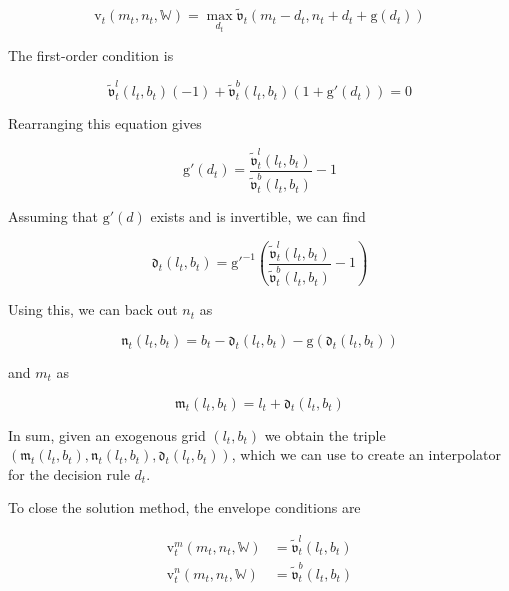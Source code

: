 \documentclass{article}
\newcommand{\bRat}{b}
\newcommand{\vFunc}{\mathrm{v}}
\newcommand{\mRat}{m}
\newcommand{\vOpt}{\tilde{\mathfrak{v}}}
\newcommand{\mEndFunc}{\mathfrak{m}}
\newcommand{\nRat}{n}
\newcommand{\dRat}{d}
\newcommand{\gFunc}{\mathrm{g}}
\newcommand{\lRat}{l}
\newcommand{\dEndFunc}{\mathfrak{d}}
\newcommand{\nEndFunc}{\mathfrak{n}}
\newcommand{\Work}{\mathbb{W}}
\begin{document}
\begin{equation}
\vFunc_{t}(\mRat_{t}, \nRat_{t}, \Work) = \max_{\dRat_{t}}
    \vOpt_{t}(\mRat_{t}
    - \dRat_{t}, \nRat_{t} + \dRat_{t} + \gFunc(\dRat_{t}))
\end{equation}

The first-order condition is

\begin{equation}
\vOpt_{t}^{\lRat}(\lRat_{t}, \bRat_{t})(-1) +
    \vOpt_{t}^{\bRat}(\lRat_{t}, \bRat_{t})(1+\gFunc'(\dRat_{t})) = 0
\end{equation}

Rearranging this equation gives

\begin{equation}
\gFunc'(\dRat_{t}) = \frac{\vOpt_{t}^{\lRat}(\lRat_{t},
        \bRat_{t})}{\vOpt_{t}^{\bRat}(\lRat_{t}, \bRat_{t})} - 1
\end{equation}

Assuming that $\gFunc'(\dRat)$ exists and is invertible, we can find

\begin{equation}
\dEndFunc_{t}(\lRat_{t}, \bRat_{t}) = \gFunc'^{-1}\left(
    \frac{\vOpt_{t}^{\lRat}(\lRat_{t},
        \bRat_{t})}{\vOpt_{t}^{\bRat}(\lRat_{t},
        \bRat_{t})} - 1 \right)
\end{equation}

Using this, we can back out $\nRat_{t}$ as

\begin{equation}
\nEndFunc_{t}(\lRat_{t}, \bRat_{t}) = \bRat_{t} -
    \dEndFunc_{t}(\lRat_{t}, \bRat_{t}) - \gFunc(\dEndFunc_{t}(\lRat_{t},
        \bRat_{t}))
\end{equation}

and $\mRat_{t}$ as

\begin{equation}
\mEndFunc_{t}(\lRat_{t}, \bRat_{t}) = \lRat_{t} +
    \dEndFunc_{t}(\lRat_{t}, \bRat_{t})
\end{equation}

In sum, given an exogenous grid $(\lRat_{t}, \bRat_{t})$ we obtain the triple
$\left(\mEndFunc_{t}(\lRat_{t}, \bRat_{t}), \nEndFunc_{t}(\lRat_{t},
        \bRat_{t}), \dEndFunc_{t}(\lRat_{t}, \bRat_{t})\right)$, which
we can use to
create an interpolator for the decision rule $\dRat_{t}$.

To close the solution method, the envelope conditions are

\begin{equation}
\begin{split}
        \vFunc_{t}^{\mRat}(\mRat_{t}, \nRat_{t}, \Work) & =
        \vOpt_{t}^{\lRat}(\lRat_{t}, \bRat_{t}) \\
        \vFunc_{t}^{\nRat}(\mRat_{t}, \nRat_{t}, \Work) & =
        \vOpt_{t}^{\bRat}(\lRat_{t}, \bRat_{t})
    \end{split}
\end{equation}
\end{document}
